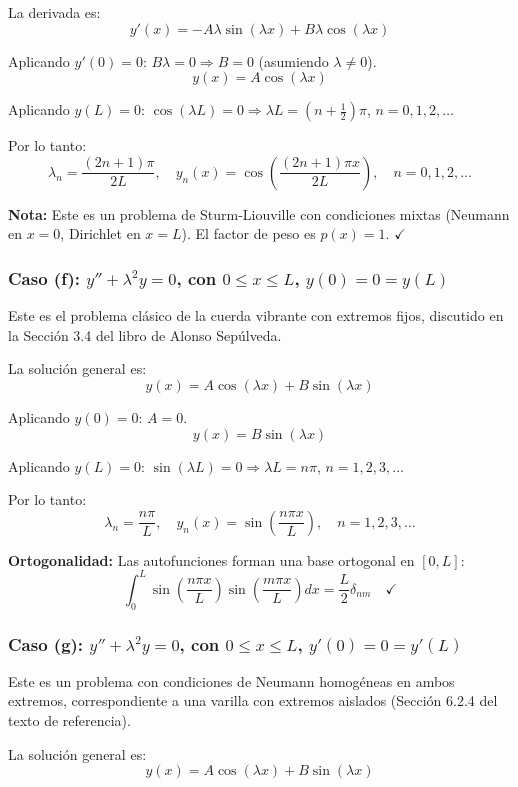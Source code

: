 \documentclass[a4paper]{article}
\begin{document}
La derivada es:
$$
y'(x) = -A\lambda \sin(\lambda x) + B\lambda \cos(\lambda x)
$$

Aplicando $y'(0) = 0$: $B\lambda = 0 \Rightarrow B = 0$ (asumiendo $\lambda \neq 0$).
$$
y(x) = A \cos(\lambda x)
$$

Aplicando $y(L) = 0$: $\cos(\lambda L) = 0 \Rightarrow \lambda L = \left(n + \frac{1}{2}\right)\pi$, $n = 0, 1, 2, \dots$

Por lo tanto:
$$
\boxed{\lambda_n = \frac{(2n+1)\pi}{2L}, \quad y_n(x) = \cos\left(\frac{(2n+1)\pi x}{2L}\right), \quad n = 0, 1, 2, \dots}
$$

\textbf{Nota:} Este es un problema de Sturm-Liouville con condiciones mixtas (Neumann en $x=0$, Dirichlet en $x=L$). El factor de peso es $p(x) = 1$. $\checkmark$

\subsubsection{Caso (f): $y'' + \lambda^2 y = 0$, con $0 \leq x \leq L$, $y(0) = 0 = y(L)$}

Este es el problema clásico de la cuerda vibrante con extremos fijos, discutido en la Sección 3.4 del libro de Alonso Sepúlveda.

La solución general es:
$$
y(x) = A \cos(\lambda x) + B \sin(\lambda x)
$$

Aplicando $y(0) = 0$: $A = 0$.
$$
y(x) = B \sin(\lambda x)
$$

Aplicando $y(L) = 0$: $\sin(\lambda L) = 0 \Rightarrow \lambda L = n\pi$, $n = 1, 2, 3, \dots$

Por lo tanto:
$$
\boxed{\lambda_n = \frac{n\pi}{L}, \quad y_n(x) = \sin\left(\frac{n\pi x}{L}\right), \quad n = 1, 2, 3, \dots}
$$

\textbf{Ortogonalidad:} Las autofunciones forman una base ortogonal en $[0, L]$:
$$
\int_0^L \sin\left(\frac{n\pi x}{L}\right) \sin\left(\frac{m\pi x}{L}\right) dx = \frac{L}{2} \delta_{nm} \quad \checkmark
$$

\subsubsection{Caso (g): $y'' + \lambda^2 y = 0$, con $0 \leq x \leq L$, $y'(0) = 0 = y'(L)$}

Este es un problema con condiciones de Neumann homogéneas en ambos extremos, correspondiente a una varilla con extremos aislados (Sección 6.2.4 del texto de referencia).

La solución general es:
$$
y(x) = A \cos(\lambda x) + B \sin(\lambda x)
$$
\end{document}

